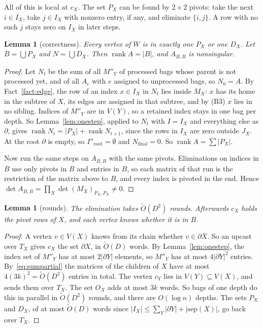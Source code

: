 \documentclass[11pt]{article}
\newtheorem{lemma}[theorem]{Lemma}
\theoremstyle{definition}
\theoremstyle{remark}
\theoremstyle{plain}
\newcommand{\Ot}{\tilde O}
\newcommand{\sep}{\mathrm{sep}}
\newcommand{\rank}{\operatorname{rank}}
\begin{document}
All of this is local at $c_X$. The set $P_X$ can be found by $2\times2$ pivots: take the next $i\in I_X$, take $j\in I_X$ with nonzero entry, if any, and
eliminate $\{i,j\}$. A row with no such $j$ stays zero on $I_X$ in later steps.

\begin{lemma}[correctness]\label{lem:elimcorrect}
Every vertex of $W$ is in exactly one $P_X$ or one $D_X$. Let $B=\bigcup P_X$ and $N=\bigcup D_X$. Then $\rank A=|B|$, and $A_{B,B}$ is nonsingular.
\end{lemma}
\begin{proof}
Let $N_t$ be the sum of all $M''_Y$ of processed bags whose parent is not processed yet, and of all $A_e$ with $e$ assigned to unprocessed bags, so
$N_0=A$. By Fact~\ref{fact:edge}, the row of an index $x\in I_X$ in $N_t$ lies inside $M_X$: $x$ has its home in the subtree of $X$, its edges are assigned in that
subtree, and by (B3) $x$ lies in no sibling. Indices of $M''_Y$ are in $V(Y)$, so a retained index stays in one bag per depth. So Lemma~\ref{lem:onestep},
applied to $N_t$ with $I=I_X$ and everything else as $\partial$, gives $\rank N_t=|P_X|+\rank N_{t+1}$, since the rows in $I_X$ are zero outside $J_X$. At the
root $\partial$ is empty, so $I''_{\mathrm{root}}=\emptyset$ and $N_{\mathrm{final}}=0$. So $\rank A=\sum|P_X|$.

Now run the same steps on $A_{B,B}$ with the same pivots. Eliminations on indices in $B$ use only pivots in $B$ and entries in $B$, so each matrix of
that run is the restriction of the matrix above to $B$, and every index is pivoted in the end. Hence $\det A_{B,B}=\prod_X\det(M_X)_{P_X,P_X}\ne0$.
\end{proof}

\begin{lemma}[rounds]\label{lem:elimrounds}
The elimination takes $\Ot(D^2)$ rounds. Afterwards $c_X$ holds the pivot rows of $X$, and each vertex knows whether it is in $B$.
\end{lemma}
\begin{proof}
A vertex $v\in V(X)$ knows from its chain whether $v\in\partial X$. So an upcast over $T_X$ gives $c_X$ the set $\partial X$, in $\Ot(D)$ words. By
Lemma~\ref{lem:onestep}, the index set of $M''_Y$ has at most $2|\partial Y|$ elements, so $M''_Y$ has at most $4|\partial Y|^2$ entries. By~\eqref{eq:sumpartial} the
matrices of the children of $X$ have at most $4(3k)^2=\Ot(D^2)$ entries in total. The vertex $c_Y$ lies in $V(Y)\subseteq V(X)$, and sends them over $T_X$. The
set $O_X$ adds at most $3k$ words. So bags of one depth do this in parallel in $\Ot(D^2)$ rounds, and there are $O(\log n)$ depths. The sets $P_X$ and
$D_X$, of at most $\Ot(D)$ words since $|I_X|\le\sum_Y|\partial Y|+|\sep(X)|$, go back over $T_X$.
\end{proof}
\end{document}
